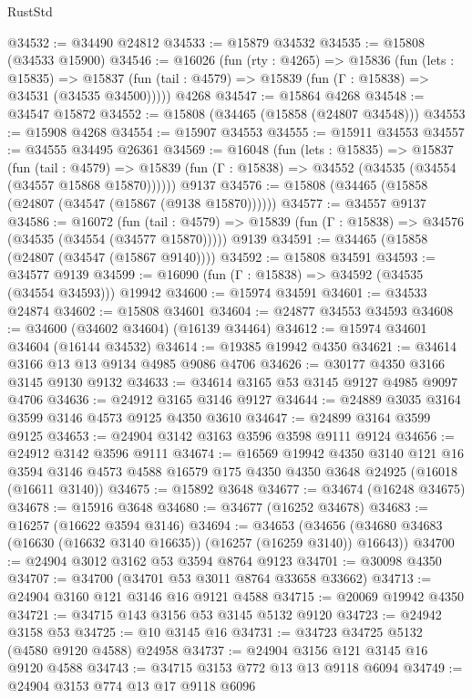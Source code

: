 \begin{lexlean}{RustStd}
\begin{coremodule}
@34532 := @34490 @24812
@34533 := @15879 @34532
@34535 := @15808 (@34533 @15900)
@34546 := @16026
    (fun (rty : @4265) =>
    @15836
      (fun (lets : @15835) =>
      @15837 (fun (tail : @4579) => @15839 (fun (Γ : @15838) => @34531 (@34535 @34500)))))
    @4268
@34547 := @15864 @4268
@34548 := @34547 @15872
@34552 := @15808 (@34465 (@15858 (@24807 @34548)))
@34553 := @15908 @4268
@34554 := @15907 @34553
@34555 := @15911 @34553
@34557 := @34555 @34495 @26361
@34569 := @16048
    (fun (lets : @15835) =>
    @15837
      (fun (tail : @4579) =>
      @15839 (fun (Γ : @15838) => @34552 (@34535 (@34554 (@34557 @15868 @15870))))))
    @9137
@34576 := @15808 (@34465 (@15858 (@24807 (@34547 (@15867 (@9138 @15870))))))
@34577 := @34557 @9137
@34586 := @16072
    (fun (tail : @4579) => @15839 (fun (Γ : @15838) => @34576 (@34535 (@34554 (@34577 @15870)))))
    @9139
@34591 := @34465 (@15858 (@24807 (@34547 (@15867 @9140))))
@34592 := @15808 @34591
@34593 := @34577 @9139
@34599 := @16090 (fun (Γ : @15838) => @34592 (@34535 (@34554 @34593))) @19942
@34600 := @15974 @34591
@34601 := @34533 @24874
@34602 := @15808 @34601
@34604 := @24877 @34553 @34593
@34608 := @34600 (@34602 @34604) (@16139 @34464)
@34612 := @15974 @34601 @34604 (@16144 @34532)
@34614 := @19385 @19942 @4350
@34621 := @34614 @3166 @13 @13 @9134 @4985 @9086 @4706
@34626 := @30177 @4350 @3166 @3145 @9130 @9132
@34633 := @34614 @3165 @53 @3145 @9127 @4985 @9097 @4706
@34636 := @24912 @3165 @3146 @9127
@34644 := @24889 @3035 @3164 @3599 @3146 @4573 @9125 @4350 @3610
@34647 := @24899 @3164 @3599 @9125
@34653 := @24904 @3142 @3163 @3596 @3598 @9111 @9124
@34656 := @24912 @3142 @3596 @9111
@34674 := @16569
    @19942
    @4350
    @3140
    @121
    @16
    @3594
    @3146
    @4573
    @4588
    @16579
    @175
    @4350
    @4350
    @3648
    @24925
    (@16018 (@16611 @3140))
@34675 := @15892 @3648
@34677 := @34674 (@16248 @34675)
@34678 := @15916 @3648
@34680 := @34677 (@16252 @34678)
@34683 := @16257 (@16622 @3594 @3146)
@34694 := @34653
    (@34656 (@34680 @34683 (@16630 (@16632 @3140 @16635)) (@16257 (@16259 @3140)) @16643))
@34700 := @24904 @3012 @3162 @53 @3594 @8764 @9123
@34701 := @30098 @4350
@34707 := @34700 (@34701 @53 @3011 @8764 @33658 @33662)
@34713 := @24904 @3160 @121 @3146 @16 @9121 @4588
@34715 := @20069 @19942 @4350
@34721 := @34715 @143 @3156 @53 @3145 @5132 @9120
@34723 := @24942 @3158 @53
@34725 := @10 @3145 @16
@34731 := @34723 @34725 @5132 (@4580 @9120 @4588) @24958
@34737 := @24904 @3156 @121 @3145 @16 @9120 @4588
@34743 := @34715 @3153 @772 @13 @13 @9118 @6094
@34749 := @24904 @3153 @774 @13 @17 @9118 @6096

\end{coremodule}
\end{lexlean}
